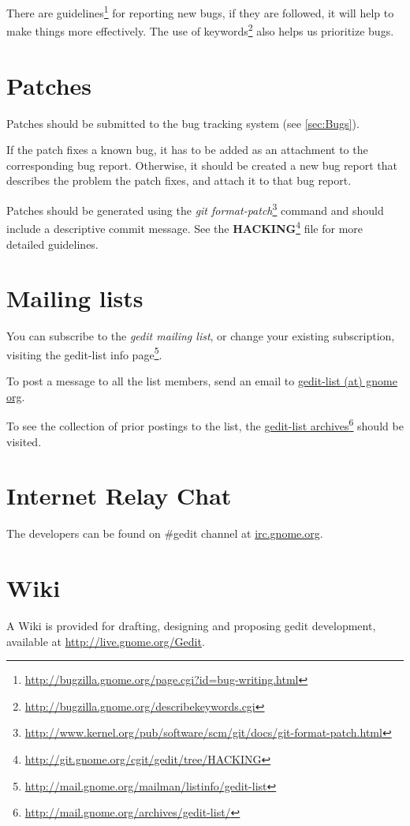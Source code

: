 There are guidelines\footnote{\url{http://bugzilla.gnome.org/page.cgi?id=bug-writing.html}} for reporting new bugs, if they are followed, it will help to make things more effectively. The use of keywords\footnote{\url{http://bugzilla.gnome.org/describekeywords.cgi}} also helps us prioritize bugs.

\section{Patches}\label{sec:Patches}

Patches should be submitted to the bug tracking system (see \ref{sec:Bugs}).

If the patch fixes a known bug, it has to be added as an attachment to the corresponding bug report. Otherwise, it should be created a new bug report that describes the problem the patch fixes, and attach it to that bug report.

Patches should be generated using the \textit{git format-patch}\footnote{\url{http://www.kernel.org/pub/software/scm/git/docs/git-format-patch.html}} command and should include a descriptive commit message. See the \textbf{HACKING}\footnote{\url{http://git.gnome.org/cgit/gedit/tree/HACKING}} file for more detailed guidelines.

\section{Mailing lists}\label{sec:Mailing}

You can subscribe to the \emph{gedit mailing list}, or change your existing subscription, visiting the gedit-list info page\footnote{\url{http://mail.gnome.org/mailman/listinfo/gedit-list}}.

To post a message to all the list members, send an email to \href{mailto:gedit-list@gnome org}{gedit-list (at) gnome org}.

To see the collection of prior postings to the list, the \href{http://mail.gnome.org/archives/gedit-list/}{gedit-list archives}\footnote{\url{http://mail.gnome.org/archives/gedit-list/}} should be visited.

\section{Internet Relay Chat}\label{sec:IRC}

The developers can be found on \#gedit channel at \url{irc.gnome.org}.

\section{Wiki}\label{sec:Wiki}

A Wiki is provided for drafting, designing and proposing gedit development, available at \url{http://live.gnome.org/Gedit}.

